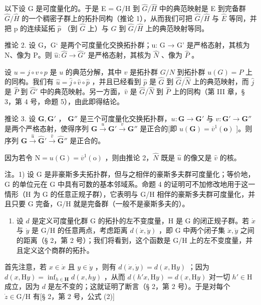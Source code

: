 以下设 G 是可度量化的。于是 E = G/H 到 \(\hat{G}/\hat{H}\) 中的典范映射是 E 到完备群 \(\hat{G}/\hat{H}\) 的一个稠密子群上的拓扑同构（推论 1），从而我们可把 \(\hat{G}/\hat{H}\) 与 \(\hat{E}\) 等同，并把 p 的连续延拓 \(\hat{p}\) （到 \(\hat{G}\) 上）与 \(\hat{G}\) 到 \(\hat{G}/\hat{H}\) 上的典范映射等同。

推论 2. 设 G，G‘ 是两个可度量化交换拓扑群；u: G → G’ 是严格态射，其核为 N、像为 P。则 \(\hat{u} : \hat{G} \rightarrow \hat{G}'\) 是严格态射，其核为 \(\hat{N}\) 、像为 \(\hat{P}\) 。

设 \(u = j \circ v \circ p\) 是 \(u\) 的典范分解，其中 \(v\) 是拓扑群 \(G/N\) 到拓扑群 \(u(G) = P\) 上的同构。我们有 \(\hat{u} = \hat{j} \circ \hat{v} \circ \hat{p}\) ，并且已经看到 \(\hat{p}\) 是 \(\hat{G}\) 到 \(\hat{G}/\hat{N}\) 上的典范映射，而 \(\hat{j}\) 是 \(\hat{P}\) 到 \(\hat{G}'\) 中的典范映射。另一方面，\(\hat{v}\) 是 \(\hat{G}/\hat{N}\) 到 \(\hat{P}\) 上的同构（第 III 章，§ 3，第 4 号，命题 5），由此即得结论。

推论 3. 设 \(\mathbf{G}, \mathbf{G}'\) ， \(\mathbf{G}''\) 是三个可度量化交换拓扑群，\(u: \mathbf{G} \to \mathbf{G}'\) 与 \(v: \mathbf{G}' \to \mathbf{G}''\) 是两个严格态射，使得序列 \(\mathbf{G} \xrightarrow{u} \mathbf{G}' \xrightarrow{v} \mathbf{G}''\) 是正合的{[}即 \(u(\mathbf{G}) = \overline{v}^{1}(\mathbf{o})\) {]}。则序列 \(\hat{\mathbf{G}} \xrightarrow{\hat{u}} \hat{\mathbf{G}}' \xrightarrow{\hat{v}} \hat{\mathbf{G}}''\) 是正合的。

因为若令 \(\mathrm{N} = u(\mathrm{G}) = \overline{v}^{1}(\mathrm{o})\) ，则由推论 2，\(\hat{N}\) 既是 \(\hat{u}\) 的像又是 \(\hat{v}\) 的核。

注。1) 设 G 是非豪斯多夫拓扑群，但与之相伴的豪斯多夫群可度量化；等价地，G 的单位元在 G 中具有可数的基本邻域系。命题 4 的证明可不加修改地用于这一情形（H 为 G 的任意正规子群），它表明与 G/H 相伴的豪斯多夫群可度量化，并且只要 G 完备，G/H 就是完备群（一般不是豪斯多夫的）。

\begin{enumerate}
\def\labelenumi{\arabic{enumi})}
\setcounter{enumi}{1}
\tightlist
\item
  设 \(d\) 是定义可度量化群 G 的拓扑的左不变度量，H 是 G 的闭正规子群。若 \(\dot{x}\) 与 \(\dot{y}\) 是 G/H 的任意两点，考虑距离 \(d(\dot{x},\dot{y})\) ，即 G 中两个闭子集 \(\dot{x},\dot{y}\) 之间的距离（§ 2，第 2 号）；我们将看到，这个函数是 G/H 上的左不变度量，并且定义这个商群的拓扑。
\end{enumerate}

首先注意，若 \(x \in \dot{x}\) 且 \(y \in \dot{y}\) ，则有 \(d(\dot{x}, \dot{y}) = d(x, \mathrm{H}y)\) ；因为 \(d(x, \mathrm{H}y) = \inf_{h \in \mathbf{H}} d(x, h y)\) ，从而 \(d(h' x, \mathrm{H} y) = d(x, \mathrm{H} y)\) 对一切 \(h' \in \mathrm{H}\) 成立，因为 \(d\) 是左不变的；这就证明了断言（§ 2，第 2 号）。于是对每个 \(\dot{z} \in \mathrm{G} / \mathrm{H}\) 有{[}§ 2，第 2 号，公式 (2){]}

